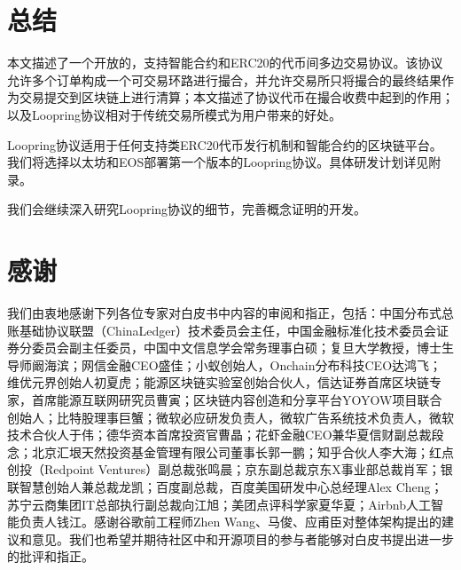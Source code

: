 \documentclass[UTF8,nofonts]{ctexart}
\begin{document}

\section{总结\label{sec:summary}}

本文描述了一个开放的，支持智能合约和ERC20的代币间多边交易协议。该协议允许多个订单构成一个可交易环路进行撮合，并允许交易所只将撮合的最终结果作为交易提交到区块链上进行清算；本文描述了协议代币在撮合收费中起到的作用；以及Loopring协议相对于传统交易所模式为用户带来的好处。

Loopring协议适用于任何支持类ERC20代币发行机制和智能合约的区块链平台。我们将选择以太坊和EOS部署第一个版本的Loopring协议。具体研发计划详见附录。

我们会继续深入研究Loopring协议的细节，完善概念证明的开发。

\section{感谢\label{sec:acknowledgement}}

我们由衷地感谢下列各位专家对白皮书中内容的审阅和指正，包括：中国分布式总账基础协议联盟（ChinaLedger）技术委员会主任，中国金融标准化技术委员会证券分委员会副主任委员，中国中文信息学会常务理事白硕；复旦大学教授，博士生导师阚海滨；网信金融CEO盛佳；小蚁创始人，Onchain分布科技CEO达鸿飞；维优元界创始人初夏虎；能源区块链实验室创始合伙人，信达证券首席区块链专家，首席能源互联网研究员曹寅；区块链内容创造和分享平台YOYOW项目​联合创始人；比特股理事巨蟹；微软必应研发负责人，微软广告系统技术负责人，微软技术合伙人于伟；德华资本首席投资官​曹晶；花虾金融CEO兼华夏信财副总裁段念；北京汇垠天然投资基金管理有限公司董事长郭一鹏；知乎合伙人李大海；红点创投（Redpoint Ventures）副总裁张鸣晨；京东副总裁京东X事业部总裁肖军；银联智慧创始人兼总裁龙凯；百度副总裁，百度美国研发中心总经理Alex Cheng；苏宁云商集团IT总部执行副总裁向江旭；美团点评科学家夏华夏；Airbnb人工智能负责人钱江。感谢谷歌前工程师Zhen Wang、马俊、应甫臣对整体架构提出的建议和意见。我们也希望并期待社区中和开源项目的参与者能够对白皮书提出进一步的批评和指正。

\newpage



\newpage
\end{document}
